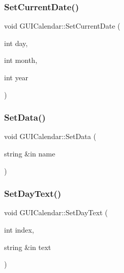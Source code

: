 \hypertarget{class_g_u_i_calendar_a98f98dd6664cddb6933191f29f10fdb0}{}\label{class_g_u_i_calendar_a98f98dd6664cddb6933191f29f10fdb0} 
\subsubsection{\texorpdfstring{Set\+Current\+Date()}{SetCurrentDate()}}
{\footnotesize\ttfamily void G\+U\+I\+Calendar\+::\+Set\+Current\+Date (\begin{DoxyParamCaption}\item[{int}]{day,  }\item[{int}]{month,  }\item[{int}]{year }\end{DoxyParamCaption})}

\hypertarget{class_g_u_i_calendar_a582df5083c47ff53fb725eba6cb0ea84}{}\label{class_g_u_i_calendar_a582df5083c47ff53fb725eba6cb0ea84} 
\subsubsection{\texorpdfstring{Set\+Data()}{SetData()}}
{\footnotesize\ttfamily void G\+U\+I\+Calendar\+::\+Set\+Data (\begin{DoxyParamCaption}\item[{string \&in}]{name }\end{DoxyParamCaption})}

\hypertarget{class_g_u_i_calendar_ad141ebe396a0b0a457e939266f09e0be}{}\label{class_g_u_i_calendar_ad141ebe396a0b0a457e939266f09e0be} 
\subsubsection{\texorpdfstring{Set\+Day\+Text()}{SetDayText()}}
{\footnotesize\ttfamily void G\+U\+I\+Calendar\+::\+Set\+Day\+Text (\begin{DoxyParamCaption}\item[{int}]{index,  }\item[{string \&in}]{text }\end{DoxyParamCaption})}

